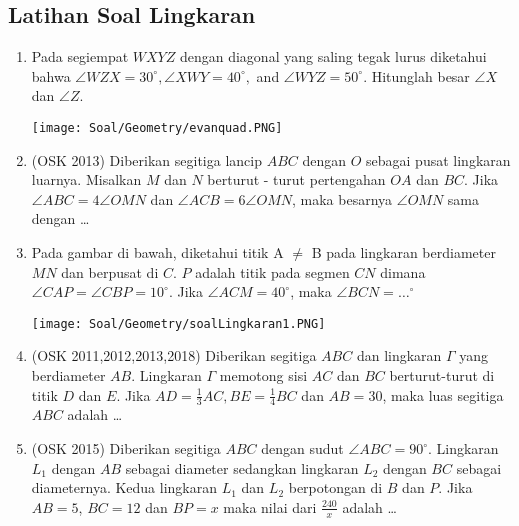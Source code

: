 \subsection{Latihan Soal Lingkaran}
\begin{enumerate}
    \item Pada segiempat $WXYZ$ dengan diagonal yang saling tegak lurus diketahui bahwa $\angle WZX = 30^\circ, \angle XWY = 40^\circ,$ and $\angle WYZ = 50^\circ$. Hitunglah besar $\angle X$ dan $\angle Z$.
    \begin{center}
        \texttt{[image: Soal/Geometry/evanquad.PNG]}
    \end{center}
		
    \item (OSK 2013) Diberikan segitiga lancip $ABC$ dengan $O$ sebagai pusat lingkaran luarnya. Misalkan $M$ dan $N$ berturut - turut pertengahan $OA$ dan $BC$. Jika $\angle ABC = 4\angle OMN$ dan $\angle ACB = 6\angle OMN$, maka besarnya $\angle OMN$ sama dengan \dots

    \item 	Pada gambar di bawah, diketahui titik A $\ne$ B pada lingkaran berdiameter $MN$ dan berpusat di $C$. $P$ adalah titik pada segmen $CN$ dimana $\angle CAP = \angle CBP = 10 ^\circ$. Jika $\angle ACM = 40^\circ$, maka $\angle BCN = \dots^\circ$	
    \begin{center}
         \texttt{[image: Soal/Geometry/soalLingkaran1.PNG]}
    \end{center}

    \item (OSK 2011,2012,2013,2018) Diberikan segitiga $ABC$ dan lingkaran $\Gamma$ yang berdiameter $AB$. Lingkaran $\Gamma$ memotong sisi $AC$ dan $BC$ berturut-turut di titik $D$ dan $E$. Jika $AD = \frac13 AC, BE =\frac14 BC$ dan $AB = 30$, maka luas segitiga $ABC$ adalah \dots

    \item (OSK 2015) Diberikan segitiga $ABC$ dengan sudut $\angle ABC = 90^\circ$. Lingkaran $L_1$ dengan $AB$ sebagai diameter sedangkan lingkaran $L_2$ dengan $BC$ sebagai diameternya. Kedua lingkaran $L_1$ dan $L_2$ berpotongan di $B$ dan $P$. Jika $AB = 5$, $BC = 12$ dan $BP = x$ maka nilai dari $\frac{240}{x}$ adalah \ldots
\end{enumerate}